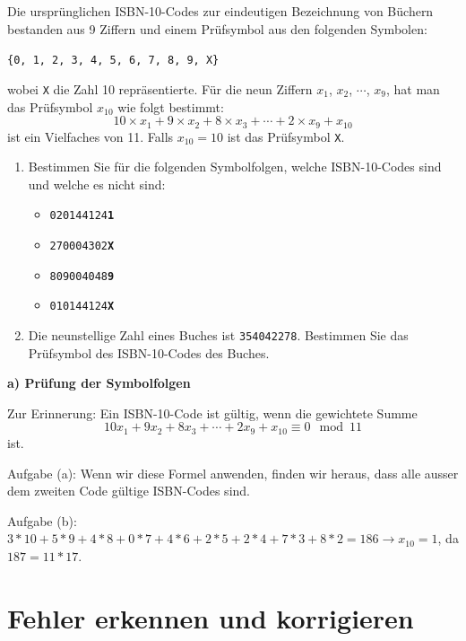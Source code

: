 \begin{myexercise}
    Die ursprünglichen \gls{ISBN}-10-Codes zur eindeutigen Bezeichnung von Büchern bestanden aus 9 Ziffern und einem Prüfsymbol aus den folgenden Symbolen:

    \texttt{\{0, 1, 2, 3, 4, 5, 6, 7, 8, 9, X\}}

    wobei \texttt{X} die Zahl 10 repräsentierte. Für die neun Ziffern $x_1$, $x_2$, $\cdots$, $x_9$, hat man das Prüfsymbol $x_{10}$ wie folgt bestimmt:
    \[10\times x_1+9\times x_2+8\times x_3+\cdots+2\times x_9 + x_{10}\]
    ist ein Vielfaches von 11. Falls $x_{10} = 10$ ist das Prüfsymbol \texttt{X}.
    \begin{enumerate}
        \item Bestimmen Sie für die folgenden Symbolfolgen, welche \gls{ISBN}-10-Codes sind und welche es nicht sind:
              \begin{itemize}
                  \item \texttt{020144124\textbf{1}}
                  \item \texttt{270004302\textbf{X}}
                  \item \texttt{809004048\textbf{9}}
                  \item \texttt{010144124\textbf{X}}
              \end{itemize}
        \item Die neunstellige Zahl eines Buches ist \texttt{354042278}. Bestimmen Sie das Prüfsymbol des \gls{ISBN}-10-Codes des Buches.
    \end{enumerate}
    \begin{myanswer}
        \textbf{a) Prüfung der Symbolfolgen}

        Zur Erinnerung: Ein \gls{ISBN}-10-Code ist gültig, wenn die gewichtete Summe
        \[
            10x_1 + 9x_2 + 8x_3 + \cdots + 2x_9 + x_{10} \equiv 0 \mod 11
        \]
        ist.

        Aufgabe (a): Wenn wir diese Formel anwenden, finden wir heraus, dass alle ausser dem zweiten Code gültige \gls{ISBN}-Codes sind.

        Aufgabe (b): $3*10+5*9+4*8+0*7+4*6+2*5+2*4+7*3+8*2=186 \rightarrow x_{10}=1$, da $187=11*17$.

    \end{myanswer}

\end{myexercise}

\section{Fehler erkennen und korrigieren}

